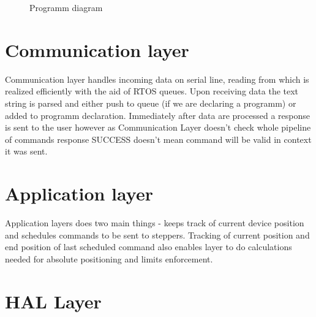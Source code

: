\begin{figure}[h!]

  \caption[Programm diagram]{Programm diagram}
  \label{fig:code_diag}
\end{figure}

\section{Communication layer}

Communication layer handles incoming data on serial line, reading from which is realized efficiently with the aid of RTOS queues.
Upon receiving data the text string is parsed and either push to queue (if we are declaring a programm) or added to programm declaration.
Immediately after data are processed a response is sent to the user however as Communication Layer doesn't check whole pipeline of commands response SUCCESS doesn't mean command will be valid in context it was sent.

\section{Application layer}

Application layers does two main things - keeps track of current device position and schedules commands to be sent to steppers.
Tracking of current position and end position of last scheduled command also enables layer to do calculations needed for absolute positioning and limits enforcement.

\section{HAL Layer}

